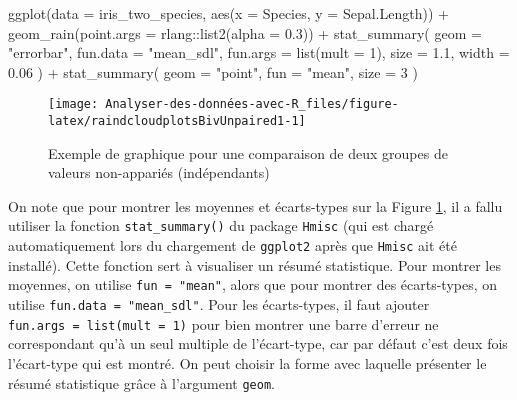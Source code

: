 \documentclass[
]{book}
\newenvironment{Shaded}{\begin{snugshade}}{\end{snugshade}}
\newcommand{\AttributeTok}[1]{\textcolor[rgb]{0.77,0.63,0.00}{#1}}
\newcommand{\DecValTok}[1]{\textcolor[rgb]{0.00,0.00,0.81}{#1}}
\newcommand{\FloatTok}[1]{\textcolor[rgb]{0.00,0.00,0.81}{#1}}
\newcommand{\FunctionTok}[1]{\textcolor[rgb]{0.00,0.00,0.00}{#1}}
\newcommand{\NormalTok}[1]{#1}
\newcommand{\SpecialCharTok}[1]{\textcolor[rgb]{0.00,0.00,0.00}{#1}}
\newcommand{\StringTok}[1]{\textcolor[rgb]{0.31,0.60,0.02}{#1}}
\begin{document}
\begin{Shaded}
\begin{Highlighting}[]
\FunctionTok{ggplot}\NormalTok{(}\AttributeTok{data =}\NormalTok{ iris\_two\_species, }\FunctionTok{aes}\NormalTok{(}\AttributeTok{x =}\NormalTok{ Species, }\AttributeTok{y =}\NormalTok{ Sepal.Length)) }\SpecialCharTok{+}
  \FunctionTok{geom\_rain}\NormalTok{(}\AttributeTok{point.args =}\NormalTok{ rlang}\SpecialCharTok{::}\FunctionTok{list2}\NormalTok{(}\AttributeTok{alpha =} \FloatTok{0.3}\NormalTok{)) }\SpecialCharTok{+}
  \FunctionTok{stat\_summary}\NormalTok{(}
    \AttributeTok{geom =} \StringTok{"errorbar"}\NormalTok{,}
    \AttributeTok{fun.data =} \StringTok{"mean\_sdl"}\NormalTok{,}
    \AttributeTok{fun.args =} \FunctionTok{list}\NormalTok{(}\AttributeTok{mult =} \DecValTok{1}\NormalTok{),}
    \AttributeTok{size =} \FloatTok{1.1}\NormalTok{, }
    \AttributeTok{width =} \FloatTok{0.06}
\NormalTok{    ) }\SpecialCharTok{+} 
  \FunctionTok{stat\_summary}\NormalTok{(}
    \AttributeTok{geom =} \StringTok{"point"}\NormalTok{,}
    \AttributeTok{fun =} \StringTok{"mean"}\NormalTok{, }
    \AttributeTok{size =} \DecValTok{3}
\NormalTok{    )}
\end{Highlighting}
\end{Shaded}

\begin{figure}

{\centering \texttt{[image: Analyser-des-données-avec-R\_files/figure-latex/raindcloudplotsBivUnpaired1-1]} 

}

\caption{Exemple de graphique pour une comparaison de deux groupes de valeurs non-appariés (indépendants)}\label{fig:raindcloudplotsBivUnpaired1}
\end{figure}

On note que pour montrer les moyennes et écarts-types sur la Figure \ref{fig:raindcloudplotsBivUnpaired1}, il a fallu utiliser la fonction \texttt{stat\_summary()} du package \texttt{Hmisc} (qui est chargé automatiquement lors du chargement de \texttt{ggplot2} après que \texttt{Hmisc} ait été installé). Cette fonction sert à visualiser un résumé statistique. Pour montrer les moyennes, on utilise \texttt{fun\ =\ "mean"}, alors que pour montrer des écarts-types, on utilise \texttt{fun.data\ =\ "mean\_sdl"}. Pour les écarts-types, il faut ajouter \texttt{fun.args\ =\ list(mult\ =\ 1)} pour bien montrer une barre d'erreur ne correspondant qu'à un seul multiple de l'écart-type, car par défaut c'est deux fois l'écart-type qui est montré. On peut choisir la forme avec laquelle présenter le résumé statistique grâce à l'argument \texttt{geom}.
\end{document}
